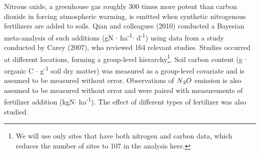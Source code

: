 \documentclass[12pt, oneside]{article}
\begin{document}
Nitrous oxide, a greenhouse gas roughly 300 times more potent than carbon dioxide in forcing atmospheric warming, is emitted when synthetic nitrogenous fertilizers are added to soils. Qian and colleagues (2010) conducted a Bayesian meta-analysis of such additions (gN $\cdot$ ha\textsuperscript{-1}$\cdot$ d\textsuperscript{-1}) using data from a study conducted by Carey (2007), who reviewed 164 relevant studies. Studies occurred at different locations, forming a group-level hierarchy\footnote{We will use only sites that have both nitrogen and carbon data, which reduces the number of sites to 107 in the analysis here.}. Soil carbon content (g $\cdot$ organic C $\cdot$ g\textsuperscript{-1} soil dry matter) was measured as a group-level covariate and is assumed to be measured without error. Observations of $N\textsubscript{2}O$ emission is also assumed to be measured without error and were paired with measurements of fertilizer addition (kgN$\cdot$ ha\textsuperscript{-1}). The effect of different types of fertilizer was also studied. 
\end{document}
